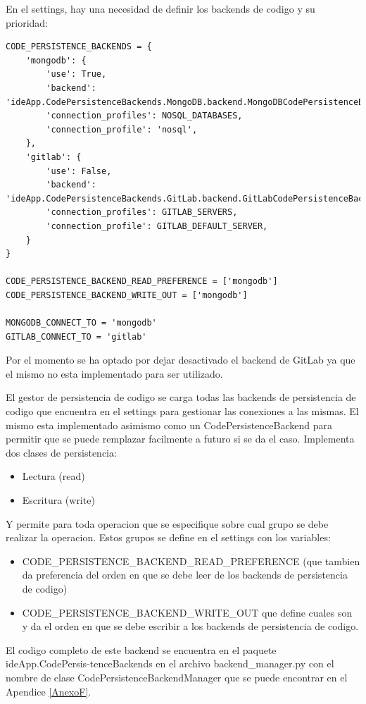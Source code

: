En el settings, hay una necesidad de definir los backends de codigo y su prioridad:
\lstset{language=Python}
\begin{lstlisting}[breaklines]
CODE_PERSISTENCE_BACKENDS = {
    'mongodb': {
        'use': True,
        'backend': 'ideApp.CodePersistenceBackends.MongoDB.backend.MongoDBCodePersistenceBackend',
        'connection_profiles': NOSQL_DATABASES,
        'connection_profile': 'nosql',
    },
    'gitlab': {
        'use': False,
        'backend': 'ideApp.CodePersistenceBackends.GitLab.backend.GitLabCodePersistenceBackend',
        'connection_profiles': GITLAB_SERVERS,
        'connection_profile': GITLAB_DEFAULT_SERVER,
    }
}

CODE_PERSISTENCE_BACKEND_READ_PREFERENCE = ['mongodb']
CODE_PERSISTENCE_BACKEND_WRITE_OUT = ['mongodb']

MONGODB_CONNECT_TO = 'mongodb'
GITLAB_CONNECT_TO = 'gitlab'
\end{lstlisting}
\lstset{language=Bash}

Por el momento se ha optado por dejar desactivado el backend de GitLab ya que el mismo no esta implementado para ser utilizado.

El gestor de persistencia de codigo se carga todas las backends de persistencia de codigo que encuentra en el settings para gestionar las conexiones a las mismas. El mismo esta implementado asimismo como un CodePersistenceBackend para permitir que se puede remplazar facilmente a futuro si se da el caso. Implementa dos clases de persistencia:
\begin{itemize}
	\item Lectura (read)
	\item Escritura (write) 
\end{itemize}
Y permite para toda operacion que se especifique sobre cual grupo se debe realizar la operacion. Estos grupos se define en el settings con los variables:
\begin{itemize}
	\item CODE\_PERSISTENCE\_BACKEND\_READ\_PREFERENCE (que tambien da preferencia del orden en que se debe leer de los backends de persistencia de codigo)
	\item CODE\_PERSISTENCE\_BACKEND\_WRITE\_OUT que define cuales son y da el orden en que se debe escribir a los backends de persistencia de codigo.
\end{itemize}
El codigo completo de este backend se encuentra en el paquete ideApp.CodePersis-tenceBackends en el archivo backend\_manager.py con el nombre de clase CodePersistenceBackendManager que se puede encontrar en el Apendice \ref{AnexoF}.

